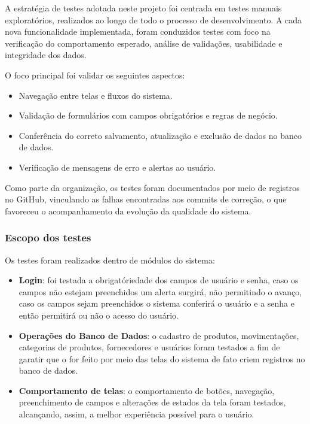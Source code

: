 \documentclass[
	12pt,				%
	openany,			%
	twoside,			%
	a4paper,			%
	english,			%
	brazil				%
	]{abntex2}
\begin{document}
A estratégia de testes adotada neste projeto foi centrada em testes manuais exploratórios, realizados ao longo de todo o processo de desenvolvimento. A cada nova funcionalidade implementada, foram conduzidos testes com foco na verificação do comportamento esperado, análise de validações, usabilidade e integridade dos dados.

O foco principal foi validar os seguintes aspectos:
\begin{itemize}
    \item Navegação entre telas e fluxos do sistema.
    \item Validação de formulários com campos obrigatórios e regras de negócio.
    \item Conferência do correto salvamento, atualização e exclusão de dados no banco de dados.
    \item Verificação de mensagens de erro e alertas ao usuário.
\end{itemize}

Como parte da organização, os testes foram documentados por meio de registros no GitHub, vinculando as falhas encontradas aos commits de correção, o que favoreceu o acompanhamento da evolução da qualidade do sistema.

\subsubsection{Escopo dos testes}

Os testes foram realizados dentro de módulos do sistema:

\begin{itemize}
    \item \textbf{Login}: foi testada a obrigatóriedade dos campos de usuário e senha, caso os campos não estejam preenchidos um alerta surgirá, não permitindo o avanço, caso os campos sejam preenchidos o sistema conferirá o usuário e a senha e então permitirá ou não o acesso do usuário.
    \item \textbf{Operações do Banco de Dados}: o cadastro de produtos, movimentações, categorias de produtos, fornecedores e usuários foram testados a fim de garatir que o for feito por meio das telas do sistema de fato criem registros no banco de dados.
    \item \textbf{Comportamento de telas}: o comportamento de botões, navegação, preenchimento de campos e alterações de estados da tela foram testados, alcançando, assim, a melhor experiência possível para o usuário.
\end{itemize}
\end{document}
